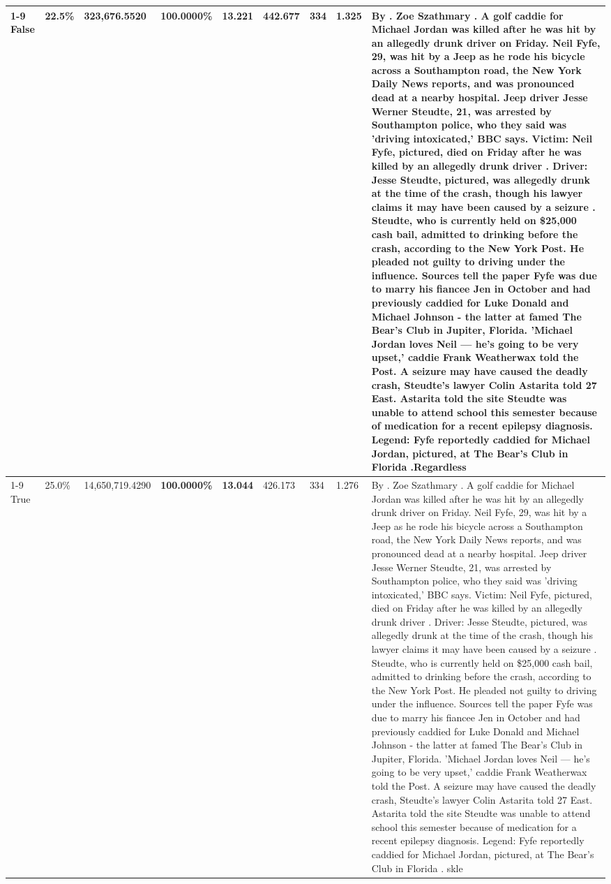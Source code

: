 \begin{table}[H]
\begin{tabular}{lllrlllll}
\cline{1-9}
False & 22.5\% & 323,676.5520 & \bfseries \color{red} 100.0000\% & 13.221 & 442.677 & 334 & 1.325 & By . Zoe Szathmary . A golf caddie for Michael Jordan was killed after he was hit by an allegedly drunk driver on Friday. Neil Fyfe, 29, was hit by a Jeep as he rode his bicycle across a Southampton road, the New York Daily News reports, and was pronounced dead at a nearby hospital. Jeep driver Jesse Werner Steudte, 21, was arrested by Southampton police, who they said was 'driving intoxicated,' BBC says. Victim: Neil Fyfe, pictured, died on Friday after he was killed by an allegedly drunk driver . Driver: Jesse Steudte, pictured, was allegedly drunk at the time of the crash, though his lawyer claims it may have been caused by a seizure . Steudte, who is currently held on \$25,000 cash bail, admitted to drinking before the crash, according to the New York Post. He pleaded not guilty to driving under the influence. Sources tell the paper Fyfe was due to marry his fiancee Jen in October and had previously caddied for Luke Donald and Michael Johnson - the latter at famed The Bear's Club in Jupiter, Florida. 'Michael Jordan loves Neil — he’s going to be very upset,' caddie Frank Weatherwax told the Post. A seizure may have caused the deadly crash, Steudte's lawyer Colin Astarita told 27 East. Astarita told the site Steudte was unable to attend school this semester because of medication for a recent epilepsy diagnosis. Legend: Fyfe reportedly caddied for Michael Jordan, pictured, at The Bear's Club in Florida .Regardless \\
\cline{1-9}
True & 25.0\% & 14,650,719.4290 & \bfseries \color{red} 100.0000\% & \bfseries \color{red} 13.044 & 426.173 & 334 & 1.276 & By . Zoe Szathmary . A golf caddie for Michael Jordan was killed after he was hit by an allegedly drunk driver on Friday. Neil Fyfe, 29, was hit by a Jeep as he rode his bicycle across a Southampton road, the New York Daily News reports, and was pronounced dead at a nearby hospital. Jeep driver Jesse Werner Steudte, 21, was arrested by Southampton police, who they said was 'driving intoxicated,' BBC says. Victim: Neil Fyfe, pictured, died on Friday after he was killed by an allegedly drunk driver . Driver: Jesse Steudte, pictured, was allegedly drunk at the time of the crash, though his lawyer claims it may have been caused by a seizure . Steudte, who is currently held on \$25,000 cash bail, admitted to drinking before the crash, according to the New York Post. He pleaded not guilty to driving under the influence. Sources tell the paper Fyfe was due to marry his fiancee Jen in October and had previously caddied for Luke Donald and Michael Johnson - the latter at famed The Bear's Club in Jupiter, Florida. 'Michael Jordan loves Neil — he’s going to be very upset,' caddie Frank Weatherwax told the Post. A seizure may have caused the deadly crash, Steudte's lawyer Colin Astarita told 27 East. Astarita told the site Steudte was unable to attend school this semester because of medication for a recent epilepsy diagnosis. Legend: Fyfe reportedly caddied for Michael Jordan, pictured, at The Bear's Club in Florida . skle \\

\end{tabular}
\end{table}

